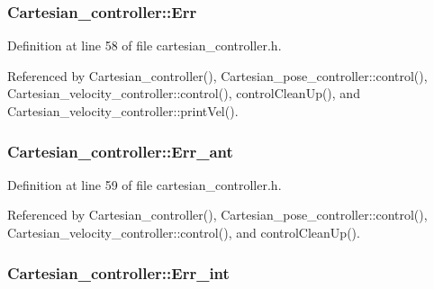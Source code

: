 \hypertarget{classCartesian__controller_ab3f08ecf10cb2486e8bfc61f07e2bde6}{
\subsubsection[{Err}]{ Cartesian\-\_\-controller\-::\-Err\hspace{0.3cm}{\ttfamily [protected]}}}\label{classCartesian__controller_ab3f08ecf10cb2486e8bfc61f07e2bde6}


Definition at line 58 of file cartesian\-\_\-controller.\-h.



Referenced by Cartesian\-\_\-controller(), Cartesian\-\_\-pose\-\_\-controller\-::control(), Cartesian\-\_\-velocity\-\_\-controller\-::control(), control\-Clean\-Up(), and Cartesian\-\_\-velocity\-\_\-controller\-::print\-Vel().

\hypertarget{classCartesian__controller_a6d9471a983f6cb6c642bf8dea0d540af}{
\subsubsection[{Err\-\_\-ant}]{ Cartesian\-\_\-controller\-::\-Err\-\_\-ant\hspace{0.3cm}{\ttfamily [protected]}}}\label{classCartesian__controller_a6d9471a983f6cb6c642bf8dea0d540af}


Definition at line 59 of file cartesian\-\_\-controller.\-h.



Referenced by Cartesian\-\_\-controller(), Cartesian\-\_\-pose\-\_\-controller\-::control(), Cartesian\-\_\-velocity\-\_\-controller\-::control(), and control\-Clean\-Up().

\hypertarget{classCartesian__controller_a248174c6399a8933bfcc8f1b0b39af5e}{
\subsubsection[{Err\-\_\-int}]{ Cartesian\-\_\-controller\-::\-Err\-\_\-int\hspace{0.3cm}{\ttfamily [protected]}}}\label{classCartesian__controller_a248174c6399a8933bfcc8f1b0b39af5e}


